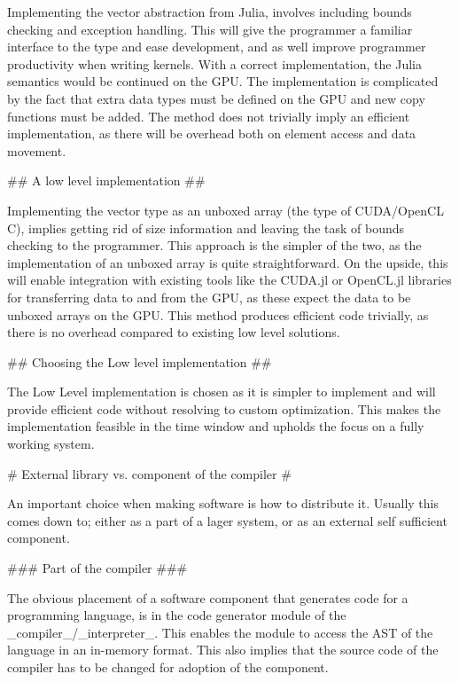 \begin{markdown}
Implementing the vector abstraction from Julia, involves including
bounds checking and exception handling. This will give the programmer
a familiar interface to the type and ease development, and as well
improve programmer productivity when writing kernels. With a correct
implementation, the Julia semantics would be continued on the GPU. The
implementation is complicated by the fact that extra data types must
be defined on the GPU and new copy functions must be added. The method
does not trivially imply an efficient implementation, as there will be
overhead both on element access and data movement.

## A low level implementation ##
\label{sec:meth:arrays:low-level}

Implementing the vector type as an unboxed array (the type of
CUDA/OpenCL C), implies getting rid of size information and leaving
the task of bounds checking to the programmer. This approach is the
simpler of the two, as the implementation of an unboxed array is quite
straightforward. On the upside, this will enable integration with
existing tools like the CUDA.jl or OpenCL.jl libraries for transferring
data to and from the GPU, as these expect the data to be unboxed arrays
on the GPU. This method produces efficient code trivially, as there is
no overhead compared to existing low level solutions.

## Choosing the Low level implementation ##

The Low Level implementation is chosen as it is simpler to implement
and will provide efficient code without resolving to custom
optimization. This makes the implementation feasible in the time
window and upholds the focus on a fully working system.

# External library vs. component of the compiler #
\label{sec:meth:lib-b-comp}



An important choice when making software is how to distribute
it. Usually this comes down to; either as a part of a lager system,
or as an external self sufficient component.

### Part of the compiler ###

The obvious placement of a software component that generates code for
a programming language, is in the code generator module of the
_compiler_/_interpreter_. This enables the module to access the AST of
the language in an in-memory format. This also implies that the source
code of the compiler has to be changed for adoption of the component.


\end{markdown}
